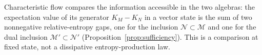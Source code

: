 \documentclass[a4paper,11pt]{article}
\theoremstyle{definition}
\newtheorem{definition}{Definition}[section]
\begin{document}
Characteristic flow compares the information accessible in the two algebras: the expectation value of its generator $K_M-K_N$ in a vector state is the sum of two nonnegative relative-entropy gaps, one for the inclusion $\mathcal N\subset\mathcal M$ and one for the dual inclusion $\mathcal M'\subset\mathcal N'$ (Proposition~\ref{prop:sufficiency}). This is a comparison at fixed state, not a dissipative entropy-production law.
\end{document}
